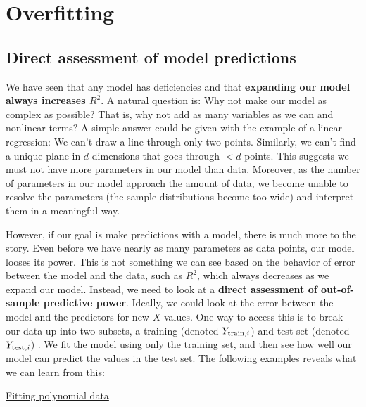 \section{Overfitting}

\subsection{Direct assessment of model predictions}

We have seen that any model has deficiencies and that {\bf expanding our model always increases $R^2$}. A natural question is: Why not make our model as complex as possible? That is, why not add as many variables as we can and nonlinear terms? A simple answer could be given with the example of a linear regression: We can't draw a line through only two points. Similarly, we can't find a unique plane in $d$ dimensions that goes through $<d$ points. This suggests we must not have more parameters in our model than data. Moreover, as the number of parameters in our model approach the amount of data, we become unable to resolve the parameters (the sample distributions become too wide) and interpret them in a meaningful way. 

However, if our goal is make predictions with a model, there is much more to the story. Even before we have nearly as many parameters as data points, our model looses its power. This is not something we can see based on the behavior of error between the model and the data, such as $R^2$, which always decreases as we expand our model. Instead, we need to look at a {\bf direct assessment of out-of-sample predictive power}. Ideally, we could look at the error between the model and the predictors for new $X$ values. One way to access this is to break our data up into two subsets, a {\dfn training}  (denoted $Y_{{\rm train},i}$) and {\dfn test} set  (denoted $Y_{{\rm test},i}$) . We fit the model using only the training set, and then see how well our model can predict the values in the test set. The following examples reveals what we can learn from this: 

\begin{example}
\href{https://colab.research.google.com/drive/1euwp8RjQ-fNru49tcTqVWYlqp2swGO4Y#scrollTo=Rz-6Ut-rrF5J}{Fitting polynomial data}
\end{example}




